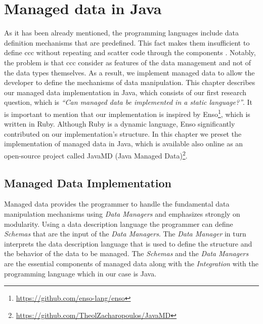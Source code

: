 
\chapter{Managed data in Java}\label{Implementation}

As it has been already mentioned, the programming languages include data definition mechanisms that are predefined. 
This fact makes them insufficient to define \ac{ccc} without repeating and scatter code through the components \cite{loh2012managed}.
Notably, the problem is that \ac{ccc} consider as features of the data management and not of the data types themselves.
As a result, we implement managed data to allow the developer to define the mechanisms of data manipulation.
This chapter describes our managed data implementation in Java, which consists of our first research question, which is \textit{``Can managed data be implemented in a static language?''}.
It is important to mention that our implementation is inspired by Enso\footnote{\url{https://github.com/enso-lang/enso}}, which is written in Ruby. 
Although Ruby is a dynamic language, Enso significantly contributed on our implementation's structure.
In this chapter we preset the implementation of managed data in Java, which is available also online as an open-source project called JavaMD (Java Managed Data)\footnote{\url{https://github.com/TheolZacharopoulos/JavaMD}}.

\section{Managed Data Implementation}\label{sec:Managed Data Implementation}
Managed data provides the programmer to handle the fundamental data manipulation mechanisms using \textit{Data Managers} and emphasizes strongly on modularity.
Using a data description language the programmer can define \textit{Schemas} that are the input of the \textit{Data Managers}. The \textit{Data Manager} in turn interprets the data description language that is used to define the structure and the behavior of the data to be managed.
The \textit{Schemas} and the \textit{Data Managers} are the essential components of managed data along with the \textit{Integration} with the programming language which in our case is Java.

